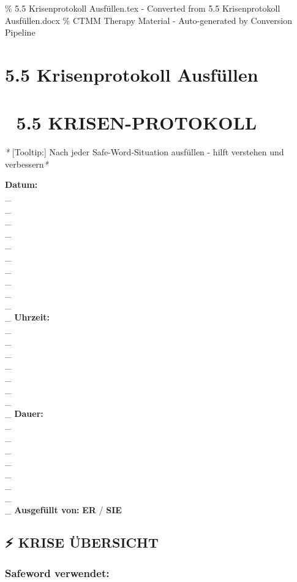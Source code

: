 \% 5.5 Krisenprotokoll Ausfüllen.tex - Converted from 5.5 Krisenprotokoll Ausfüllen.docx
\% CTMM Therapy Material - Auto-generated by Conversion Pipeline

\section{5.5 Krisenprotokoll Ausfüllen}
\label{sec:5-5-krisenprotokoll-ausf-llen}

\section{\textbf{🚨 5.5 KRISEN-PROTOKOLL}}

\textit{*}\textcolor{ctmmYellow}{\faLightbulb} [Tooltip:] Nach jeder Safe-Word-Situation ausfüllen -
hilft verstehen und verbessern\textit{*}

\textbf{Datum:} \\\_\\\_\\\_\\\_\\\_\\\_\\\_\\\_\\\_\\\_\\\_ \textbf{Uhrzeit:} \\\_\\\_\\\_\\\_\\\_\\\_\\\_\\\_
\textbf{Dauer:} \\\_\\\_\\\_\\\_\\\_\\\_\\\_\\\_ \textbf{Ausgefüllt von:} \textbf{ER} / \textbf{SIE}

\subsection{\textbf{⚡ KRISE ÜBERSICHT}}

\subsubsection{\textbf{Safeword verwendet:}}

